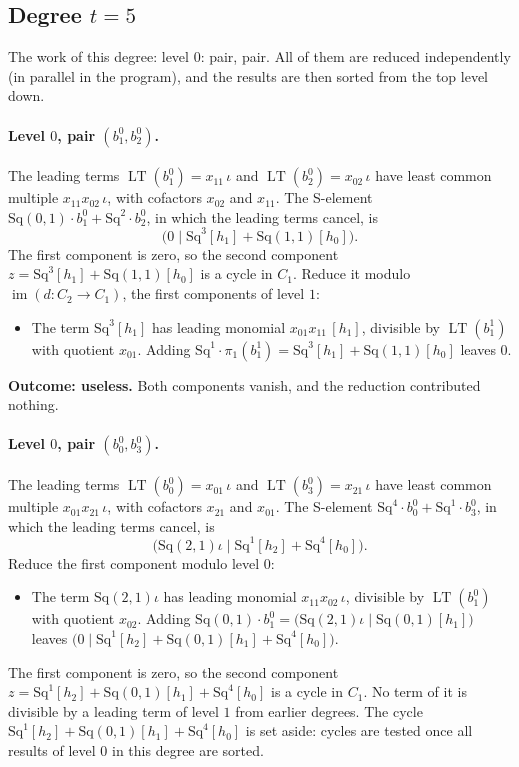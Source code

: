 \documentclass[11pt]{article}
\newcommand{\Sq}{\mathrm{Sq}}
\DeclareMathOperator{\LT}{LT}
\begin{document}
\subsection*{Degree $t = 5$}
\noindent The work of this degree: level $0$: pair, pair. All of them are reduced independently (in parallel in the program), and the results are then sorted from the top level down.
\medskip
\paragraph{Level $0$, pair $(b^{0}_{1}, b^{0}_{2})$.} The leading terms $\LT(b^{0}_{1}) = x_{11}\,\iota$ and $\LT(b^{0}_{2}) = x_{02}\,\iota$ have least common multiple $x_{11}x_{02}\,\iota$, with cofactors $x_{02}$ and $x_{11}$. The S-element $\Sq(0,1)\cdot b^{0}_{1} + \Sq^{2}\cdot b^{0}_{2}$, in which the leading terms cancel, is
\[\bigl(0 \;\big|\; \Sq^{3}[h_1] + \Sq(1,1)[h_0]\bigr).\]
The first component is zero, so the second component $z = \Sq^{3}[h_1] + \Sq(1,1)[h_0]$ is a cycle in $C_{1}$.
Reduce it modulo $\operatorname{im}(d\colon C_{2}\to C_{1})$, the first components of level $1$:
\begin{itemize}
\item The term $\Sq^{3}[h_1]$ has leading monomial $x_{01}x_{11}\,[h_1]$, divisible by $\LT(b^{1}_{1})$ with quotient $x_{01}$. Adding $\Sq^{1}\cdot \pi_1(b^{1}_{1}) = \Sq^{3}[h_1] + \Sq(1,1)[h_0]$ leaves $0$.
\end{itemize}
\textbf{Outcome: useless.} Both components vanish, and the reduction contributed nothing.
\medskip
\paragraph{Level $0$, pair $(b^{0}_{0}, b^{0}_{3})$.} The leading terms $\LT(b^{0}_{0}) = x_{01}\,\iota$ and $\LT(b^{0}_{3}) = x_{21}\,\iota$ have least common multiple $x_{01}x_{21}\,\iota$, with cofactors $x_{21}$ and $x_{01}$. The S-element $\Sq^{4}\cdot b^{0}_{0} + \Sq^{1}\cdot b^{0}_{3}$, in which the leading terms cancel, is
\[\bigl(\Sq(2,1)\iota \;\big|\; \Sq^{1}[h_2] + \Sq^{4}[h_0]\bigr).\]
Reduce the first component modulo level $0$:
\begin{itemize}
\item The term $\Sq(2,1)\iota$ has leading monomial $x_{11}x_{02}\,\iota$, divisible by $\LT(b^{0}_{1})$ with quotient $x_{02}$. Adding $\Sq(0,1)\cdot b^{0}_{1} = \bigl(\Sq(2,1)\iota \;\big|\; \Sq(0,1)[h_1]\bigr)$ leaves $\bigl(0 \;\big|\; \Sq^{1}[h_2] + \Sq(0,1)[h_1] + \Sq^{4}[h_0]\bigr)$.
\end{itemize}
The first component is zero, so the second component $z = \Sq^{1}[h_2] + \Sq(0,1)[h_1] + \Sq^{4}[h_0]$ is a cycle in $C_{1}$.
No term of it is divisible by a leading term of level $1$ from earlier degrees.
The cycle $\Sq^{1}[h_2] + \Sq(0,1)[h_1] + \Sq^{4}[h_0]$ is set aside: cycles are tested once all results of level $0$ in this degree are sorted.
\medskip
\end{document}
